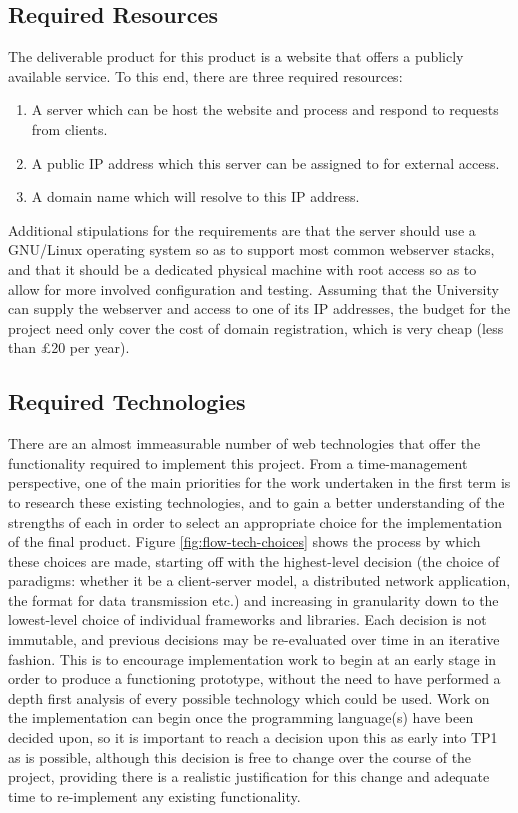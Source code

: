 \subsection{Required Resources}
The deliverable product for this product is a website that offers a publicly
available service. To this end, there are three required resources:

\begin{enumerate}
\item A server which can be host the website and process and respond to requests
  from clients.
\item A public IP address which this server can be assigned to for external
  access.
\item A domain name which will resolve to this IP address.
\end{enumerate}

Additional stipulations for the requirements are that the server should use a
GNU/Linux operating system so as to support most common webserver stacks, and
that it should be a dedicated physical machine with root access so as to allow
for more involved configuration and testing. Assuming that the University can
supply the webserver and access to one of its IP addresses, the budget for the
project need only cover the cost of domain registration, which is very cheap
(less than £20 per year).

\subsection{Required Technologies}
There are an almost immeasurable number of web technologies that offer the
functionality required to implement this project. From a time-management
perspective, one of the main priorities for the work undertaken in the first
term is to research these existing technologies, and to gain a better
understanding of the strengths of each in order to select an appropriate choice
for the implementation of the final product. Figure \ref{fig:flow-tech-choices}
shows the process by which these choices are made, starting off with the
highest-level decision (the choice of paradigms: whether it be a client-server
model, a distributed network application, the format for data transmission etc.)
and increasing in granularity down to the lowest-level choice of individual
frameworks and libraries. Each decision is not immutable, and previous decisions
may be re-evaluated over time in an iterative fashion. This is to encourage
implementation work to begin at an early stage in order to produce a functioning
prototype, without the need to have performed a depth first analysis of every
possible technology which could be used. Work on the implementation can begin
once the programming language(s) have been decided upon, so it is important to
reach a decision upon this as early into TP1 as is possible, although this
decision is free to change over the course of the project, providing there is a
realistic justification for this change and adequate time to re-implement any
existing functionality.

